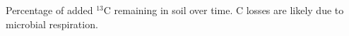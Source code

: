 Percentage of added $^{13}$C remaining in soil over time. C losses are likely
due to microbial respiration.
